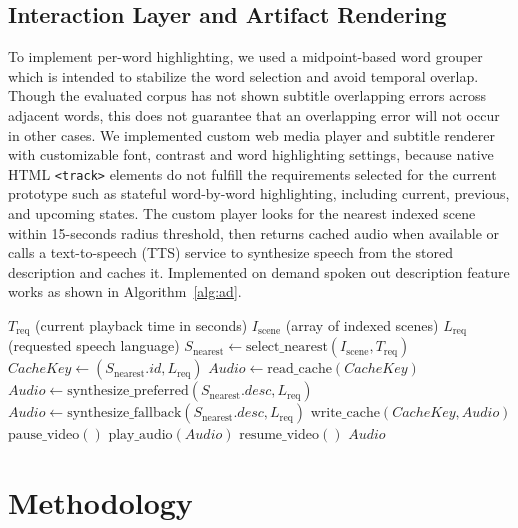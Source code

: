 \documentclass[conference]{IEEEtran}
\begin{document}
\subsection{Interaction Layer and Artifact Rendering}
To implement per-word highlighting, we used a midpoint-based word grouper which is intended to stabilize the word selection and avoid temporal overlap. Though the evaluated corpus has not shown subtitle overlapping errors across adjacent words, this does not guarantee that an overlapping error will not occur in other cases. We implemented custom web media player and subtitle renderer with customizable font, contrast and word highlighting settings, because native HTML \texttt{<track>} elements do not fulfill the requirements selected for the current prototype such as stateful word-by-word highlighting, including current, previous, and upcoming states. The custom player looks for the nearest indexed scene within 15-seconds radius threshold, then returns cached audio when available or calls a text-to-speech (TTS) service to synthesize speech from the stored description and caches it. Implemented on demand spoken out description feature works as shown in Algorithm~\ref{alg:ad}.

\begin{algorithm}[!t]
\caption{On-Demand Audio Description Resolution}
\label{alg:ad}
\begin{algorithmic}[1]
\Require $T_{\text{req}}$ (current playback time in seconds)
\Require $I_{\text{scene}}$ (array of indexed scenes)
\Require $L_{\text{req}}$ (requested speech language)
\State $S_{\text{nearest}} \gets \text{select\_nearest}(I_{\text{scene}}, T_{\text{req}})$
    \State \Return {}
\EndIf
\State $CacheKey \gets (S_{\text{nearest}}.id, L_{\text{req}})$
    \State $Audio \gets \text{read\_cache}(CacheKey)$
\Else
        \State $Audio \gets \text{synthesize\_preferred}(S_{\text{nearest}}.desc, L_{\text{req}})$
    \Else
        \State $Audio \gets \text{synthesize\_fallback}(S_{\text{nearest}}.desc, L_{\text{req}})$
    \EndIf
    \State $\text{write\_cache}(CacheKey, Audio)$
\EndIf
\State $\text{pause\_video}()$
\State $\text{play\_audio}(Audio)$
\State $\text{resume\_video}()$
\State \Return $Audio$
\end{algorithmic}
\end{algorithm}

\section{Methodology}
\end{document}
